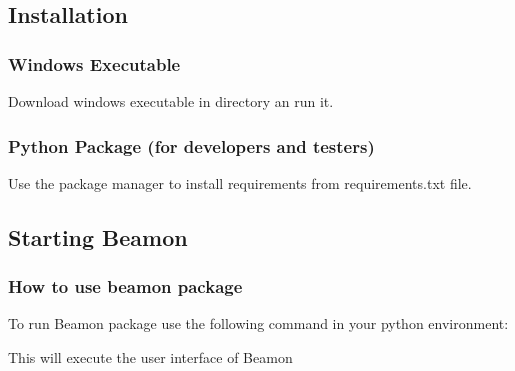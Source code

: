 \documentclass[letterpaper,10pt,english]{sphinxmanual}
\begin{document}
\subsection{Installation}
\label{\detokenize{getting_started:installation}}

\subsubsection{Windows Executable}
\label{\detokenize{getting_started:windows-executable}}
Download windows executable in  directory an run it.


\subsubsection{Python Package (for developers and testers)}
\label{\detokenize{getting_started:python-package-for-developers-and-testers}}
Use the package manager  to install requirements from requirements.txt file.


\subsection{Starting Beamon}
\label{\detokenize{getting_started:starting-beamon}}

\subsubsection{How to use beamon package}
\label{\detokenize{getting_started:how-to-use-beamon-package}}
To run Beamon package use the following command in your python environment:

\begin{sphinxVerbatim}[commandchars=\\\{\}]
  
\end{sphinxVerbatim}

This will execute the user interface of Beamon
\end{document}
